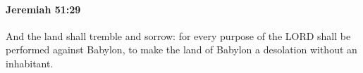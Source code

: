 
		\paragraph{Jeremiah 51:29} %
			\label{JEREMIAH-51-29}

			And the land shall tremble and sorrow: for every purpose of the LORD shall be performed against Babylon, to make the land of Babylon a desolation without an inhabitant.


